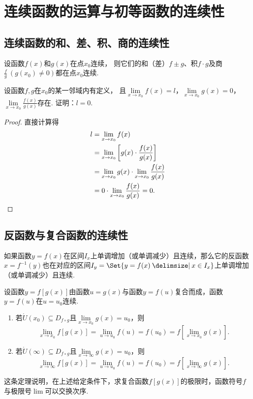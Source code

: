 \section{连续函数的运算与初等函数的连续性}
\subsection{连续函数的和、差、积、商的连续性}
\begin{theorem}\label{theorem:极限.连续函数的极限1}
设函数\(f(x)\)和\(g(x)\)在点\(x_0\)连续，
则它们的和（差）\(f \pm g\)、积\(f \cdot g\)及商\(\frac{f}{g}\ (g(x_0)\neq0)\)都在点\(x_0\)连续.
\end{theorem}

\begin{example}
设函数\(f,g\)在\(x_0\)的某一邻域内有定义，
\def\l{\lim\limits_{x\to x_0}}%
且\(\l f(x)=l\)，\(\l g(x)=0\)，\(\l \frac{f(x)}{g(x)}\)存在.
证明：\(l=0\).
\begin{proof}
直接计算得
\begin{align*}
	l &= \l f(x) \\
	&= \l \left[
		g(x) \cdot \frac{f(x)}{g(x)}
	\right] \\
	&= \l g(x) \cdot \l \frac{f(x)}{g(x)} \\
	&= 0 \cdot \l \frac{f(x)}{g(x)} = 0.
	\qedhere
\end{align*}
\end{proof}
\end{example}

\subsection{反函数与复合函数的连续性}
\begin{theorem}\label{theorem:极限.连续函数的极限2}
如果函数\(y = f(x)\)在区间\(I_x\)上单调增加（或单调减少）且连续，那么它的反函数\(x = f^{-1}(y)\)也在对应的区间\(I_y = \Set{ y = f(x) \given x \in I_x }\)上单调增加（或单调减少）且连续.
\end{theorem}

\begin{theorem}\label{theorem:极限.连续函数的极限3}
\def\D{D_{f \circ g}}
设函数\(y = f[g(x)]\)由函数\(u = g(x)\)与函数\(y = f(u)\)复合而成，函数\(y = f(u)\)在\(u = u_0\)连续.
\begin{enumerate}
\item 若\(\mathring{U}(x_0) \subseteq \D\)且\(\lim\limits_{x \to x_0}g(x) = u_0\)，则\[
\lim\limits_{x \to x_0}f[g(x)]
= \lim\limits_{u \to u_0}f(u) = f(u_0)
= f\left[ \lim\limits_{x \to x_0} g(x) \right].
\]

\item 若\(\mathring{U}(\infty) \subseteq \D\)且\(\lim\limits_{x\to\infty}g(x) = u_0\)，则\[
\lim\limits_{x \to \infty}f[g(x)]
= \lim\limits_{u \to u_0}f(u) = f(u_0)
= f\left[ \lim\limits_{x \to \infty} g(x) \right].
\]
\end{enumerate}
\end{theorem}
这条定理说明，在上述给定条件下，求复合函数\(f[g(x)]\)的极限时，函数符号\(f\)与极限号\(\lim\)可以交换次序.

